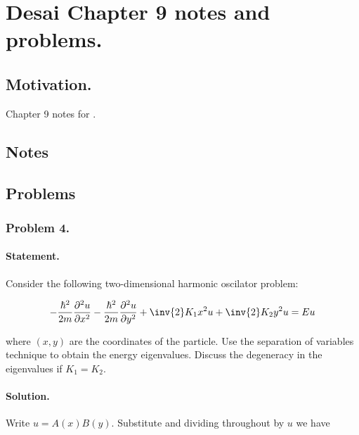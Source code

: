 
%

\chapter{Desai Chapter 9 notes and problems.}
\label{chap:desaiCh9}
{}
\date{Nov 19, 2010}

\beginArtWithToc

\section{Motivation.}

Chapter 9 notes for \cite{desai2009quantum}.

\section{Notes}
\section{Problems}

\subsection{Problem 4.}
\subsubsection{Statement.}

Consider the following two-dimensional harmonic oscilator problem:

\begin{align}\label{eqn:desaiCh9:400}
-\frac{\hbar^2}{2m} \frac{\partial^2 u}{\partial x^2}
-\frac{\hbar^2}{2m} \frac{\partial^2 u}{\partial y^2}
+ \inv{2} K_1 x^2 u
+ \inv{2} K_2 y^2 u
= E u
\end{align}

where $(x,y)$ are the coordinates of the particle.  Use the separation of variables technique to obtain the energy eigenvalues.  Discuss the degeneracy in the eigenvalues if $K_1 = K_2$.

\subsubsection{Solution.}

Write $u = A(x) B(y)$.  Substitute and dividing throughout by $u$ we have

